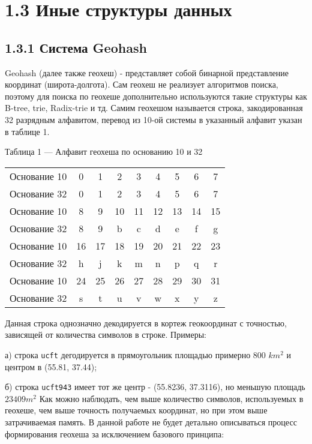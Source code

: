 \section{1.3 Иные структуры данных}

\subsection{1.3.1 Система Geohash}
Geohash (далее также геохеш) - представляет собой бинарной представление координат (широта-долгота)\cite{jiajunGeohash}. Сам геохеш не реализует алгоритмов поиска, поэтому для поиска по геохеше дополнительно используются такие структуры как B-tree, trie, Radix-trie и тд\cite{sahrIndexingSystems}.
Самим геохешом называется строка, закодированная 32 разрядным алфавитом, перевод из 10-ой системы в указанный алфавит указан в таблице 1.
\par\vspace{1em}

\noindent
Таблица 1 --- Алфавит геохеша по основанию 10 и 32
\begin{tabularx}{\textwidth}{ |X|c c c c c c c c| }
 \hline
 Основание 10 & 0 & 1 & 2 & 3 & 4 & 5 & 6 & 7 \\
 Основание 32 & 0 & 1 & 2 & 3 & 4 & 5 & 6 & 7 \\
  \hline
 Основание 10 & 8 & 9 & 10 & 11 & 12 & 13 & 14 & 15 \\
 Основание 32 & 8 & 9 & b & c & d & e & f & g \\
  \hline
 Основание 10 & 16 & 17 & 18 & 19 & 20 & 21 & 22 & 23  \\
 Основание 32 & h & j & k & m & n & p & q & r \\
  \hline
 Основание 10 & 24 & 25 & 26 & 27 & 28 & 29 & 30 & 31 \\
 Основание 32 & s & t & u & v & w & x & y & z \\
  \hline
\end{tabularx}
\par\vspace{1em}
\par\vspace{1em}

Данная строка однозначно декодируется в кортеж геокоординат с точностью, зависящей от количества символов в строке. Примеры:
\par а) строка \texttt{ucft} дегодируется в прямоугольник площадью примерно 800 $ km^2 $ и центром в (55.81, 37.44);
\par б) строка \texttt{ucft943} имеет тот же центр - (55.8236, 37.3116), но меньшую площадь $23409 m^2$
Как можно наблюдать, чем выше количество символов, используемых в геохеше, чем выше точность получаемых координат, но при этом выше затрачиваемая память\cite{sidorovGeohash}.
В данной работе не будет детально описываться процесс формирования геохеша за исключением базового принципа: 

